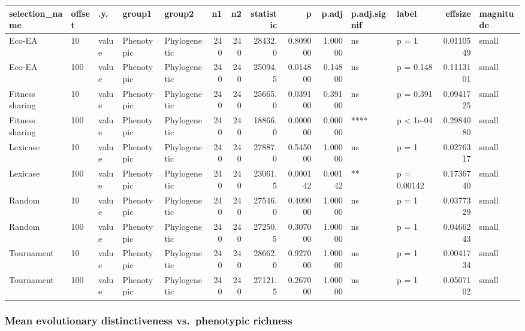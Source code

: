 \documentclass[]{book}
\begin{document}
\begin{table}
\centering
\begin{tabular}[t]{l|l|l|l|l|r|r|r|r|r|l|l|r|l}
\hline
selection\_name & offset & .y. & group1 & group2 & n1 & n2 & statistic & p & p.adj & p.adj.signif & label & effsize & magnitude\\
\hline
Eco-EA & 10 & value & Phenotypic & Phylogenetic & 240 & 240 & 28432.0 & 0.809000 & 1.00000 & ns & p = 1 & 0.0110549 & small\\
\hline
Eco-EA & 100 & value & Phenotypic & Phylogenetic & 240 & 240 & 25094.5 & 0.014800 & 0.14800 & ns & p = 0.148 & 0.1113101 & small\\
\hline
Fitness sharing & 10 & value & Phenotypic & Phylogenetic & 240 & 240 & 25665.0 & 0.039100 & 0.39100 & ns & p = 0.391 & 0.0941725 & small\\
\hline
Fitness sharing & 100 & value & Phenotypic & Phylogenetic & 240 & 240 & 18866.0 & 0.000000 & 0.00000 & **** & p < 1e-04 & 0.2984080 & small\\
\hline
Lexicase & 10 & value & Phenotypic & Phylogenetic & 240 & 240 & 27887.0 & 0.545000 & 1.00000 & ns & p = 1 & 0.0276317 & small\\
\hline
Lexicase & 100 & value & Phenotypic & Phylogenetic & 240 & 240 & 23061.5 & 0.000142 & 0.00142 & ** & p = 0.00142 & 0.1736740 & small\\
\hline
Random & 10 & value & Phenotypic & Phylogenetic & 240 & 240 & 27546.0 & 0.409000 & 1.00000 & ns & p = 1 & 0.0377329 & small\\
\hline
Random & 100 & value & Phenotypic & Phylogenetic & 240 & 240 & 27250.5 & 0.307000 & 1.00000 & ns & p = 1 & 0.0466243 & small\\
\hline
Tournament & 10 & value & Phenotypic & Phylogenetic & 240 & 240 & 28662.0 & 0.927000 & 1.00000 & ns & p = 1 & 0.0041734 & small\\
\hline
Tournament & 100 & value & Phenotypic & Phylogenetic & 240 & 240 & 27121.5 & 0.267000 & 1.00000 & ns & p = 1 & 0.0507102 & small\\
\hline
\end{tabular}
\end{table}

\hypertarget{mean-evolutionary-distinctiveness-vs.phenotypic-richness-1}{%
\subsubsection{Mean evolutionary distinctiveness vs.~phenotypic richness}\label{mean-evolutionary-distinctiveness-vs.phenotypic-richness-1}}
\end{document}
